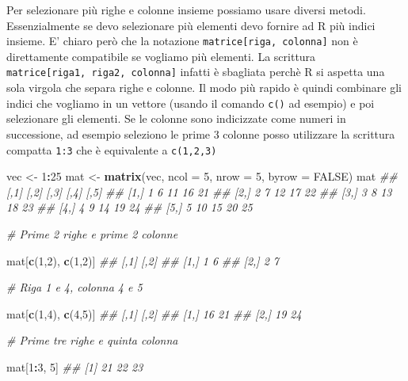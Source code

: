 \documentclass[
]{book}
\newenvironment{Shaded}{\begin{snugshade}}{\end{snugshade}}
\newcommand{\CommentTok}[1]{\textcolor[rgb]{0.56,0.35,0.01}{\textit{#1}}}
\newcommand{\DataTypeTok}[1]{\textcolor[rgb]{0.13,0.29,0.53}{#1}}
\newcommand{\DecValTok}[1]{\textcolor[rgb]{0.00,0.00,0.81}{#1}}
\newcommand{\KeywordTok}[1]{\textcolor[rgb]{0.13,0.29,0.53}{\textbf{#1}}}
\newcommand{\NormalTok}[1]{#1}
\newcommand{\OperatorTok}[1]{\textcolor[rgb]{0.81,0.36,0.00}{\textbf{#1}}}
\newcommand{\OtherTok}[1]{\textcolor[rgb]{0.56,0.35,0.01}{#1}}
\newcommand{\StringTok}[1]{\textcolor[rgb]{0.31,0.60,0.02}{#1}}
\begin{document}
Per selezionare più righe e colonne insieme possiamo usare diversi metodi. Essenzialmente se devo selezionare più elementi devo fornire ad R più indici insieme. E' chiaro però che la notazione \texttt{matrice{[}riga,\ colonna{]}} non è direttamente compatibile se vogliamo più elementi. La scrittura \texttt{matrice{[}riga1,\ riga2,\ colonna{]}} infatti è sbagliata perchè R si aspetta una sola virgola che separa righe e colonne. Il modo più rapido è quindi combinare gli indici che vogliamo in un vettore (usando il comando \texttt{c()} ad esempio) e poi selezionare gli elementi. Se le colonne sono indicizzate come numeri in successione, ad esempio seleziono le prime 3 colonne posso utilizzare la scrittura compatta \texttt{1:3} che è equivalente a \texttt{c(1,2,3)}

\begin{Shaded}
\begin{Highlighting}[]
\NormalTok{vec <-}\StringTok{ }\DecValTok{1}\OperatorTok{:}\DecValTok{25}
\NormalTok{mat <-}\StringTok{ }\KeywordTok{matrix}\NormalTok{(vec, }\DataTypeTok{ncol =} \DecValTok{5}\NormalTok{, }\DataTypeTok{nrow =} \DecValTok{5}\NormalTok{, }\DataTypeTok{byrow =} \OtherTok{FALSE}\NormalTok{)}
\NormalTok{mat}
\CommentTok{##      [,1] [,2] [,3] [,4] [,5]}
\CommentTok{## [1,]    1    6   11   16   21}
\CommentTok{## [2,]    2    7   12   17   22}
\CommentTok{## [3,]    3    8   13   18   23}
\CommentTok{## [4,]    4    9   14   19   24}
\CommentTok{## [5,]    5   10   15   20   25}

\CommentTok{# Prime 2 righe e prime 2 colonne}

\NormalTok{mat[}\KeywordTok{c}\NormalTok{(}\DecValTok{1}\NormalTok{,}\DecValTok{2}\NormalTok{), }\KeywordTok{c}\NormalTok{(}\DecValTok{1}\NormalTok{,}\DecValTok{2}\NormalTok{)]}
\CommentTok{##      [,1] [,2]}
\CommentTok{## [1,]    1    6}
\CommentTok{## [2,]    2    7}

\CommentTok{# Riga 1 e 4, colonna 4 e 5}

\NormalTok{mat[}\KeywordTok{c}\NormalTok{(}\DecValTok{1}\NormalTok{,}\DecValTok{4}\NormalTok{), }\KeywordTok{c}\NormalTok{(}\DecValTok{4}\NormalTok{,}\DecValTok{5}\NormalTok{)]}
\CommentTok{##      [,1] [,2]}
\CommentTok{## [1,]   16   21}
\CommentTok{## [2,]   19   24}

\CommentTok{# Prime tre righe e quinta colonna}

\NormalTok{mat[}\DecValTok{1}\OperatorTok{:}\DecValTok{3}\NormalTok{, }\DecValTok{5}\NormalTok{]}
\CommentTok{## [1] 21 22 23}
\end{Highlighting}
\end{Shaded}
\end{document}
